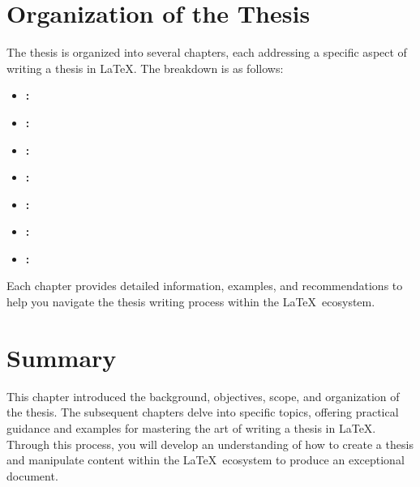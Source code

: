 	\section{Organization of the Thesis}
		The thesis is organized into several chapters, each addressing a specific aspect of writing a thesis in \LaTeX. 
		The breakdown is as follows:
		\begin{itemize}
			\item \textbf{:}  
			\item \textbf{:}  
			\item \textbf{:}  
			\item \textbf{:}  
			\item \textbf{:}  
			\item \textbf{:}  
			\item \textbf{:}  
		\end{itemize}

		Each chapter provides detailed information, examples, and recommendations to help you navigate the thesis writing process within the \LaTeX\ ecosystem.

	\section{Summary}
		This chapter introduced the background, objectives, scope, and organization of the thesis. 
		The subsequent chapters delve into specific topics, offering practical guidance and examples for mastering the art of writing a thesis in \LaTeX.
		Through this process, you will develop an understanding of how to create a thesis and manipulate content within the \LaTeX\ ecosystem to produce an exceptional document.
